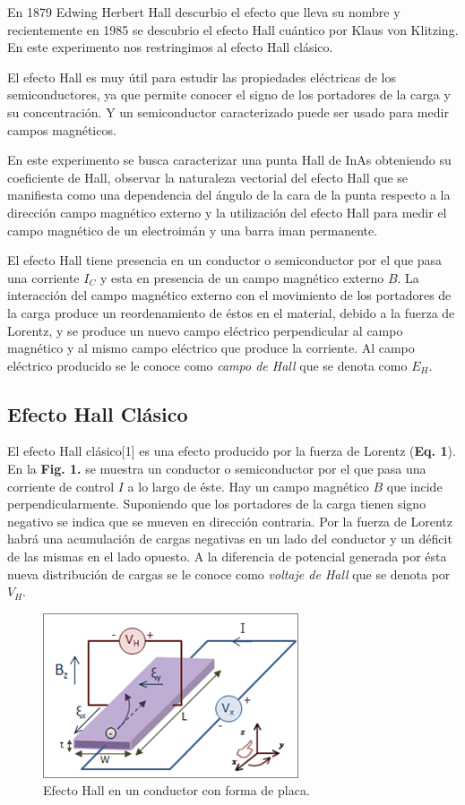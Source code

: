 \documentclass[twocolumn,showpacs,preprintnumbers,amsmath,amssymb]{revtex4-1}
\begin{document}
En 1879 Edwing Herbert Hall descurbio el efecto que lleva su nombre y recientemente en 1985 se descubrio el efecto Hall cuántico por Klaus
von Klitzing. En este experimento nos restringimos al efecto Hall clásico.

El efecto Hall es muy útil para estudir las propiedades eléctricas de los semiconductores, ya que permite conocer el
signo de los portadores de la carga y su concentración. Y un semiconductor caracterizado puede ser usado para medir campos
magnéticos.

En este experimento se busca caracterizar una punta Hall de InAs obteniendo su coeficiente de Hall, observar la naturaleza
vectorial del efecto Hall que se manifiesta como una dependencia del ángulo de la cara de la punta respecto a la dirección
campo magnético externo y la utilización del efecto Hall para medir el campo magnético de un electroimán y una barra iman
permanente.

El efecto Hall tiene presencia en un conductor o semiconductor por el que pasa una corriente $I_C$ y esta en presencia de un
campo magnético externo $B$. La interacción del campo magnético externo con el movimiento de los portadores de la carga produce
un reordenamiento de éstos en el material, debido a la fuerza de Lorentz, y se produce un nuevo campo eléctrico perpendicular
al campo magnético y al mismo campo eléctrico que produce la corriente. Al campo eléctrico producido se le conoce como \textit{campo
de Hall} que se denota como $E_H$.

\subsection{Efecto Hall Clásico}

El efecto Hall clásico[1] es una efecto producido por la fuerza de Lorentz (\textbf{Eq. 1}). En la \textbf{Fig. 1.} se muestra
un conductor o semiconductor por el que pasa una corriente de control $I$ a lo largo de éste. Hay un campo magnético $B$
que incide perpendicularmente. Suponiendo que los portadores de la carga tienen signo negativo se indica que se mueven en dirección
contraria. Por la fuerza de Lorentz habrá una acumulación de cargas negativas en un lado del conductor y un déficit
de las mismas en el lado opuesto. A la diferencia de potencial generada por ésta nueva distribución de cargas se le conoce
como \textit{voltaje de Hall} que se denota por $V_H$.

\begin{figure}
\includegraphics[scale=1]{figura_1.png}
\caption{\label{fig:epsart}Efecto Hall en un conductor con forma de placa.}
\end{figure}
\end{document}
